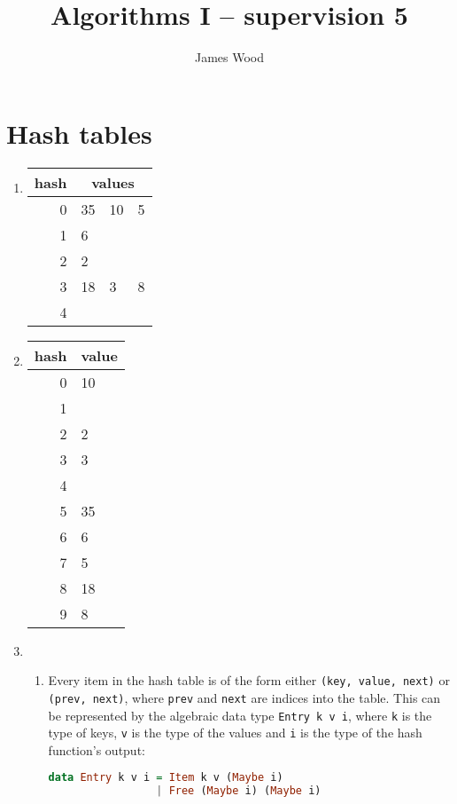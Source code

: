 \documentclass[11pt]{article}
\title{\textbf{Algorithms I -- supervision 5}}
\author{James Wood}
\begin{document}
\renewcommand{\labelenumi}{(\alph{enumi})}
\renewcommand{\labelenumii}{(\roman{enumii})}

\maketitle

\section{Hash tables}
\begin{enumerate}
\item
  \begin{tabular}[t]{r || l | l | l}
    hash & \multicolumn{3}{|c}{values} \\
    \hline
    0 & 35 & 10 & 5 \\
    1 &  6 &    & \\
    2 &  2 &    & \\
    3 & 18 &  3 & 8 \\
    4 &    &    & \\
  \end{tabular}
\item
  \begin{tabular}[t]{r || l}
    hash & value \\
    \hline
    0 & 10 \\
    1 &    \\
    2 & 2  \\
    3 & 3  \\
    4 &    \\
    5 & 35 \\
    6 & 6  \\
    7 & 5  \\
    8 & 18 \\
    9 & 8  \\
  \end{tabular}
\item
  \begin{enumerate}
  \item
    Every item in the hash table is of the form either \texttt{(key, value, next)} or \texttt{(prev, next)}, where \texttt{prev} and \texttt{next} are indices into the table. This can be represented by the algebraic data type \texttt{Entry k v i}, where \texttt k is the type of keys, \texttt v is the type of the values and \texttt i is the type of the hash function's output:
    \begin{lstlisting}[language=haskell]
data Entry k v i = Item k v (Maybe i)
                 | Free (Maybe i) (Maybe i)

\end{lstlisting}
\end{enumerate}
\end{enumerate}
\end{document}

